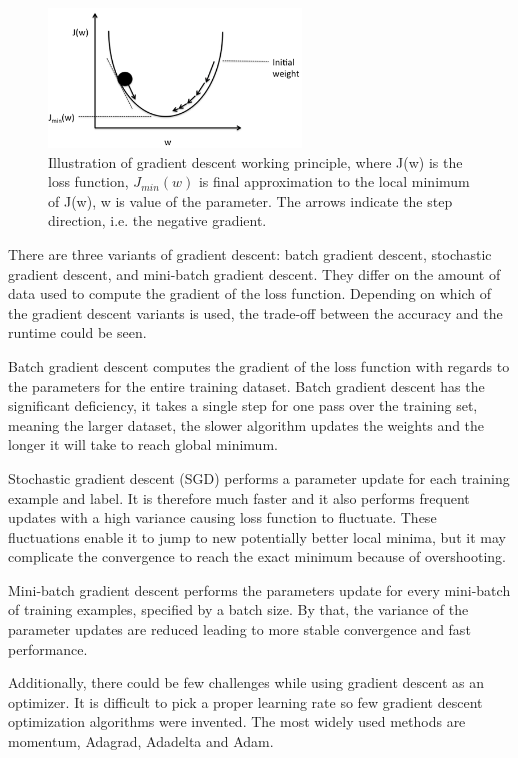 \begin{figure} [H]
\centering
\includegraphics[width=0.6\textwidth]{figures/GDgraph}
\caption{Illustration of gradient descent working principle, where J(w) is the loss function, $J_{min}(w)$ is final approximation to the local minimum of J(w), w is value of the parameter. The arrows indicate the step direction, i.e. the negative gradient.\citep{Raschka2016}}
\label{fig:GDgraph}  
\end{figure}

\noindent
There are three variants of gradient descent: batch gradient descent, stochastic gradient descent, and mini-batch gradient descent. They differ on the amount of data used to compute the gradient of the loss function. Depending on which of the gradient descent variants is used, the trade-off between the accuracy and the runtime could be seen.

\noindent
Batch gradient descent computes the gradient of the loss function with regards to the parameters for the entire training dataset. Batch gradient descent has the significant deficiency, it takes a single step for one pass over the training set, meaning the larger dataset, the slower algorithm updates the weights and the longer it will take to reach global minimum.\citep{Ruder2016} 

\noindent
Stochastic gradient descent (SGD) performs a parameter update for each training example and label. It is therefore much faster and it also performs frequent updates with a high variance causing loss function to fluctuate. These fluctuations enable it to jump to new potentially better local minima, but it may complicate the convergence to reach the exact minimum because of overshooting.\citep{Zhang2014}

\noindent
Mini-batch gradient descent performs the parameters update for every mini-batch of training examples, specified by a batch size. By that, the variance of the parameter updates are reduced leading to more stable convergence and fast performance.\citep{Ruder2016}

\noindent
Additionally, there could be few challenges while using gradient descent as an optimizer. It is difficult to pick a proper learning rate so few gradient descent optimization algorithms were invented. The most widely used methods are momentum, Adagrad, Adadelta and Adam.\citep{Ruder2016} 

